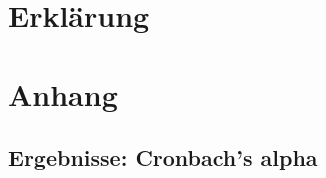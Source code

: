 \documentclass[12pt,smallheadings, bibliography=totoc]{scrartcl}
\begin{document}
\pagebreak
\printbibliography
\section{Erklärung}
\centering
{}

\pagebreak
\appendix


  \section{Anhang}
  \subsection{Ergebnisse: Cronbach's alpha}
  \label{sec:cron}
  
\end{document}
